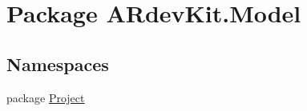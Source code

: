 \hypertarget{namespace_a_rdev_kit_1_1_model}{\section{Package A\-Rdev\-Kit.\-Model}
\label{namespace_a_rdev_kit_1_1_model}
}
\subsection*{Namespaces}
\begin{DoxyCompactItemize}
\item 
package \hyperlink{namespace_a_rdev_kit_1_1_model_1_1_project}{Project}
\end{DoxyCompactItemize}
